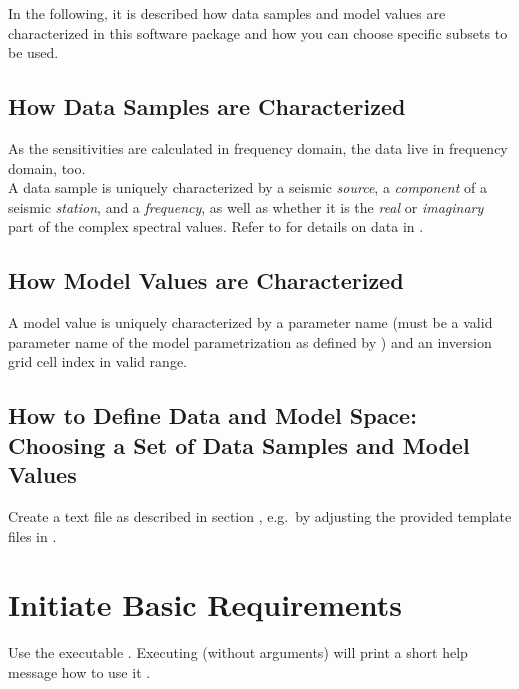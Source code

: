 In the following, it is described how data samples and model values are characterized in this software package and 
how you can choose specific subsets to be used. 
\subsection{How Data Samples are Characterized}
As the sensitivities are calculated in frequency domain, the data live in frequency domain, too.\\
A data sample is uniquely characterized by a seismic \emph{source}, a \emph{component} 
of a seismic \emph{station}, and a \emph{frequency}, as well as whether it is the \emph{real} or \emph{imaginary} part 
of the complex spectral values. Refer to  for details on data in \ASKI{}.
\subsection{How Model Values are Characterized} \label{basic_steps,sec:dmspace,sub:mparam}
A model value is uniquely  characterized by a parameter name (must be a valid parameter name of the model
parametrization as defined by  ) 
and an inversion grid cell index in valid range.
\subsection{How to Define Data and Model Space: Choosing a Set of Data Samples and Model Values}
Create a text file as described in section , e.g.\ by adjusting the provided
template files in .
%
\section{Initiate Basic Requirements} \label{basic_steps,sec:initBasics}
%
Use the executable . Executing  (without arguments) 
will print a short help message how to use it .

